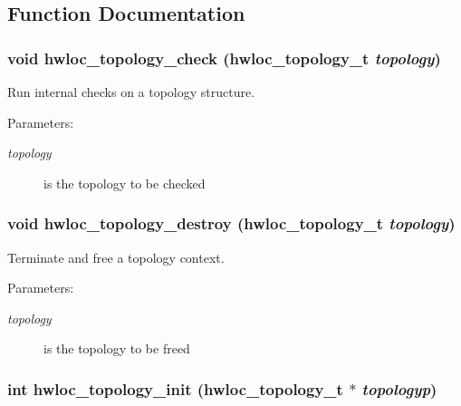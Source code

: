 \subsection{Function Documentation}
\hypertarget{group__hwlocality__creation_gf6746bc3a558ef1ac8348b4491d091b5}{
\subsubsection[{hwloc\_\-topology\_\-check}]{\setlength{\rightskip}{0pt plus 5cm}void hwloc\_\-topology\_\-check ({\bf hwloc\_\-topology\_\-t} {\em topology})}}
\label{group__hwlocality__creation_gf6746bc3a558ef1ac8348b4491d091b5}


Run internal checks on a topology structure. 

\begin{Desc}
\item[Parameters:]
\begin{description}
\item[{\em topology}]is the topology to be checked \end{description}
\end{Desc}
\hypertarget{group__hwlocality__creation_g9f34a640b6fd28d23699d4d084667b15}{
\subsubsection[{hwloc\_\-topology\_\-destroy}]{\setlength{\rightskip}{0pt plus 5cm}void hwloc\_\-topology\_\-destroy ({\bf hwloc\_\-topology\_\-t} {\em topology})}}
\label{group__hwlocality__creation_g9f34a640b6fd28d23699d4d084667b15}


Terminate and free a topology context. 

\begin{Desc}
\item[Parameters:]
\begin{description}
\item[{\em topology}]is the topology to be freed \end{description}
\end{Desc}
\hypertarget{group__hwlocality__creation_g03fd4a16d8b9ee1ffc32b25fd2f6bdfa}{
\subsubsection[{hwloc\_\-topology\_\-init}]{\setlength{\rightskip}{0pt plus 5cm}int hwloc\_\-topology\_\-init ({\bf hwloc\_\-topology\_\-t} $\ast$ {\em topologyp})}}
\label{group__hwlocality__creation_g03fd4a16d8b9ee1ffc32b25fd2f6bdfa}


